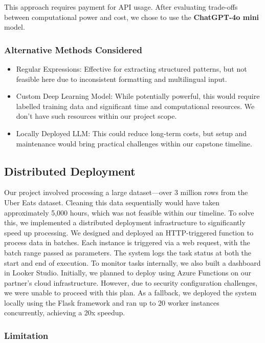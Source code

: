 \documentclass[
  11pt,
  a4paper,
  DIV=11,
  numbers=noendperiod]{scrartcl}
\providecommand{\tightlist}{%
  \setlength{\itemsep}{0pt}\setlength{\parskip}{0pt}}\usepackage{longtable,booktabs,array}
\begin{document}
This approach requires payment for API usage. After evaluating
trade-offs between computational power and cost, we chose to use the
\textbf{ChatGPT-4o mini} model.

\subsubsection{Alternative Methods
Considered}\label{alternative-methods-considered}

\begin{itemize}
\tightlist
\item
  Regular Expressions: Effective for extracting structured patterns, but
  not feasible here due to inconsistent formatting and multilingual
  input.
\item
  Custom Deep Learning Model: While potentially powerful, this would
  require labelled training data and significant time and computational
  resources. We don't have such resources within our project scope.
\item
  Locally Deployed LLM: This could reduce long-term costs, but setup and
  maintenance would bring practical challenges within our capstone
  timeline.
\end{itemize}

\subsection{Distributed Deployment}\label{distributed-deployment}

Our project involved processing a large dataset---over 3 million rows
from the Uber Eats dataset. Cleaning this data sequentially would have
taken approximately 5,000 hours, which was not feasible within our
timeline. To solve this, we implemented a distributed deployment
infrastructure to significantly speed up processing. We designed and
deployed an HTTP-triggered function to process data in batches. Each
instance is triggered via a web request, with the batch range passed as
parameters. The system logs the task status at both the start and end of
execution. To monitor tasks internally, we also built a dashboard in
Looker Studio. Initially, we planned to deploy using Azure Functions on
our partner's cloud infrastructure. However, due to security
configuration challenges, we were unable to proceed with this plan. As a
fallback, we deployed the system locally using the Flask framework and
ran up to 20 worker instances concurrently, achieving a 20x speedup.

\subsubsection{Limitation}\label{limitation-1}
\end{document}
